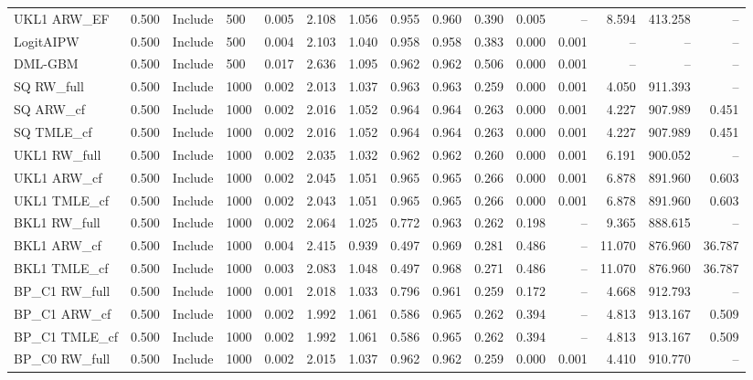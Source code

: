 \begin{tabular}{llllrrrrrrrrrrr}
UKL1 ARW\_EF & 0.500 & Include & 500 & 0.005 & 2.108 & 1.056 & 0.955 & 0.960 & 0.390 & 0.005 & -- & 8.594 & 413.258 & -- \\
LogitAIPW & 0.500 & Include & 500 & 0.004 & 2.103 & 1.040 & 0.958 & 0.958 & 0.383 & 0.000 & 0.001 & -- & -- & -- \\
DML-GBM & 0.500 & Include & 500 & 0.017 & 2.636 & 1.095 & 0.962 & 0.962 & 0.506 & 0.000 & 0.001 & -- & -- & -- \\
SQ RW\_full & 0.500 & Include & 1000 & 0.002 & 2.013 & 1.037 & 0.963 & 0.963 & 0.259 & 0.000 & 0.001 & 4.050 & 911.393 & -- \\
SQ ARW\_cf & 0.500 & Include & 1000 & 0.002 & 2.016 & 1.052 & 0.964 & 0.964 & 0.263 & 0.000 & 0.001 & 4.227 & 907.989 & 0.451 \\
SQ TMLE\_cf & 0.500 & Include & 1000 & 0.002 & 2.016 & 1.052 & 0.964 & 0.964 & 0.263 & 0.000 & 0.001 & 4.227 & 907.989 & 0.451 \\
UKL1 RW\_full & 0.500 & Include & 1000 & 0.002 & 2.035 & 1.032 & 0.962 & 0.962 & 0.260 & 0.000 & 0.001 & 6.191 & 900.052 & -- \\
UKL1 ARW\_cf & 0.500 & Include & 1000 & 0.002 & 2.045 & 1.051 & 0.965 & 0.965 & 0.266 & 0.000 & 0.001 & 6.878 & 891.960 & 0.603 \\
UKL1 TMLE\_cf & 0.500 & Include & 1000 & 0.002 & 2.043 & 1.051 & 0.965 & 0.965 & 0.266 & 0.000 & 0.001 & 6.878 & 891.960 & 0.603 \\
BKL1 RW\_full & 0.500 & Include & 1000 & 0.002 & 2.064 & 1.025 & 0.772 & 0.963 & 0.262 & 0.198 & -- & 9.365 & 888.615 & -- \\
BKL1 ARW\_cf & 0.500 & Include & 1000 & 0.004 & 2.415 & 0.939 & 0.497 & 0.969 & 0.281 & 0.486 & -- & 11.070 & 876.960 & 36.787 \\
BKL1 TMLE\_cf & 0.500 & Include & 1000 & 0.003 & 2.083 & 1.048 & 0.497 & 0.968 & 0.271 & 0.486 & -- & 11.070 & 876.960 & 36.787 \\
BP\_C1 RW\_full & 0.500 & Include & 1000 & 0.001 & 2.018 & 1.033 & 0.796 & 0.961 & 0.259 & 0.172 & -- & 4.668 & 912.793 & -- \\
BP\_C1 ARW\_cf & 0.500 & Include & 1000 & 0.002 & 1.992 & 1.061 & 0.586 & 0.965 & 0.262 & 0.394 & -- & 4.813 & 913.167 & 0.509 \\
BP\_C1 TMLE\_cf & 0.500 & Include & 1000 & 0.002 & 1.992 & 1.061 & 0.586 & 0.965 & 0.262 & 0.394 & -- & 4.813 & 913.167 & 0.509 \\
BP\_C0 RW\_full & 0.500 & Include & 1000 & 0.002 & 2.015 & 1.037 & 0.962 & 0.962 & 0.259 & 0.000 & 0.001 & 4.410 & 910.770 & -- \\

\end{tabular}
